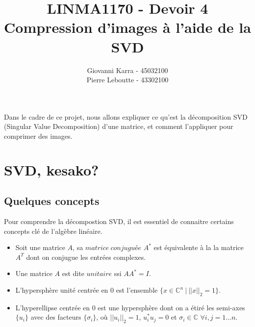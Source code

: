\documentclass[11pt]{article}
\title{LINMA1170 - Devoir 4\\Compression d'images à l'aide de la SVD}
\author{Giovanni Karra - 45032100\\Pierre Leboutte - 43302100}
\begin{document}
\maketitle

Dans le cadre de ce projet, nous allons expliquer ce qu'est la décomposition SVD (Singular Value Decomposition) d'une matrice, et comment l'appliquer pour comprimer des images.

\section*{SVD, kesako?}

\subsection*{Quelques concepts}
Pour comprendre la décompostion SVD, il est essentiel de connaitre certains concepts clé de l'algèbre linéaire.
\begin{itemize}
	\item Soit une matrice $A$, sa $matrice ~conjugu$é$e$ $A^*$ est équivalente à la la matrice $A^T$ dont on conjugue les entrées complexes. 
	\item Une matrice $A$ est dite $unitaire$ ssi $AA^* = I$.
	\item L'hypersphère unité centrée en 0 est l'ensemble $\{x \in \mathbb{C}^n ~|~ ||x||_2 = 1\}$.
	\item L'hyperellipse centrée en 0 est une hypersphère dont on a étiré les semi-axes $\{u_i\}$ avec des facteurs $\{\sigma_i\}$, où $||u_i||_2 = 1$, $u_i^*u_j = 0$ et $\sigma_i \in \mathbb{C}$ \space\space $\forall i, j = {1...n}$.
\end{itemize}
\end{document}

